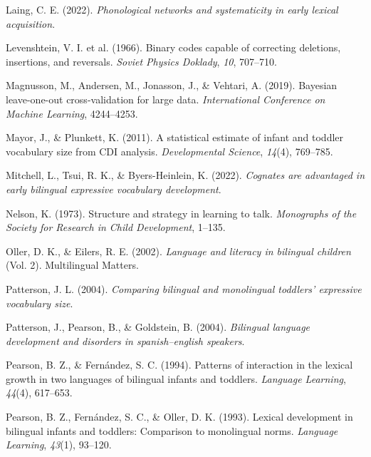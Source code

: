 \documentclass[
  letterpaper,
  DIV=11,
  numbers=noendperiod]{scrartcl}
\newlength{\cslhangindent}
\newlength{\cslentryspacingunit} %
\newenvironment{CSLReferences}[2] %
 {%
  \setlength{\parindent}{0pt}
  \ifodd #1
  \let\oldpar\par
  \def\par{\hangindent=\cslhangindent\oldpar}
  \fi
  \setlength{\parskip}{#2\cslentryspacingunit}
 }%
 {}
\begin{document}
\begin{CSLReferences}{1}{0}
\leavevmode{}%
Laing, C. E. (2022). \emph{Phonological networks and systematicity in
early lexical acquisition}.

\leavevmode{}%
Levenshtein, V. I. et al. (1966). Binary codes capable of correcting
deletions, insertions, and reversals. \emph{Soviet Physics Doklady},
\emph{10}, 707--710.

\leavevmode{}%
Magnusson, M., Andersen, M., Jonasson, J., \& Vehtari, A. (2019).
Bayesian leave-one-out cross-validation for large data.
\emph{International Conference on Machine Learning}, 4244--4253.

\leavevmode{}%
Mayor, J., \& Plunkett, K. (2011). A statistical estimate of infant and
toddler vocabulary size from CDI analysis. \emph{Developmental Science},
\emph{14}(4), 769--785.

\leavevmode{}%
Mitchell, L., Tsui, R. K., \& Byers-Heinlein, K. (2022). \emph{Cognates
are advantaged in early bilingual expressive vocabulary development}.

\leavevmode{}%
Nelson, K. (1973). Structure and strategy in learning to talk.
\emph{Monographs of the Society for Research in Child Development},
1--135.

\leavevmode{}%
Oller, D. K., \& Eilers, R. E. (2002). \emph{Language and literacy in
bilingual children} (Vol. 2). Multilingual Matters.

\leavevmode{}%
Patterson, J. L. (2004). \emph{Comparing bilingual and monolingual
toddlers' expressive vocabulary size}.

\leavevmode{}%
Patterson, J., Pearson, B., \& Goldstein, B. (2004). \emph{Bilingual
language development and disorders in spanish--english speakers}.

\leavevmode{}%
Pearson, B. Z., \& Fernández, S. C. (1994). Patterns of interaction in
the lexical growth in two languages of bilingual infants and toddlers.
\emph{Language Learning}, \emph{44}(4), 617--653.

\leavevmode{}%
Pearson, B. Z., Fernández, S. C., \& Oller, D. K. (1993). Lexical
development in bilingual infants and toddlers: Comparison to monolingual
norms. \emph{Language Learning}, \emph{43}(1), 93--120.


\end{CSLReferences}
\end{document}
